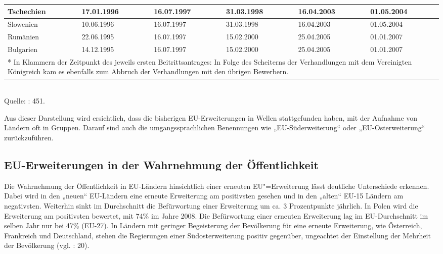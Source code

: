 \begin{table}[H]
\begin{tabular}{|p{2cm}|p{2cm}|p{2cm}|p{2cm}|p{2cm}|p{2cm}|}
Tschechien&
17.01.1996&
16.07.1997&
31.03.1998&
16.04.2003&
01.05.2004\\\hline
Slowenien&
10.06.1996&
16.07.1997&
31.03.1998&
16.04.2003&
01.05.2004\\\hline
Rumänien&
22.06.1995&
16.07.1997&
15.02.2000&
25.04.2005&
01.01.2007\\\hline
Bulgarien&
14.12.1995&
16.07.1997&
15.02.2000&
25.04.2005&
01.01.2007\\\hline
\multicolumn{6}{|p{12cm}|}{* In Klammern der Zeitpunkt des jeweils ersten Beitrittsantrages: In Folge des Scheiterns der Verhandlungen mit dem Vereinigten Königreich kam es ebenfalls zum Abbruch der Verhandlungen mit den übrigen Bewerbern.}\\\hline
\end{tabular}\\
\scriptsize{Quelle: \cite{wessels}: 451.}
\end{table}
Aus dieser Darstellung wird ersichtlich, dass die bisherigen EU-Erweiterungen in Wellen stattgefunden haben, mit der Aufnahme von Ländern oft in Gruppen. Darauf sind auch die umgangssprachlichen Benennungen wie „EU-Süderweiterung“ oder „EU-Osterweiterung“ zurückzuführen. 

\subsection{EU-Erweiterungen in der Wahrnehmung der Öffentlichkeit}
Die Wahrnehmung der Öffentlichkeit in EU-Ländern hinsichtlich einer erneuten EU"=Erweiterung lässt deutliche Unterschiede erkennen. Dabei wird in den „neuen“ EU-Ländern eine erneute Erweiterung am positivsten gesehen und in den „alten“ EU-15 Ländern am negativsten. Weiterhin sinkt im Durchschnitt die Befürwortung einer Erweiterung um ca. 3 Prozentpunkte jährlich. In Polen wird die Erweiterung am positivsten bewertet, mit 74\% im Jahre 2008. Die Befürwortung einer erneuten Erweiterung lag im EU-Durchschnitt im selben Jahr nur bei 47\% (EU-27). In Ländern mit geringer Begeisterung der Bevölkerung für eine erneute Erweiterung, wie Österreich, Frankreich und Deutschland, stehen die Regierungen einer Südosterweiterung positiv gegenüber, ungeachtet der Einstellung der Mehrheit der Bevölkerung (vgl. \cite{mus}: 20).\par

